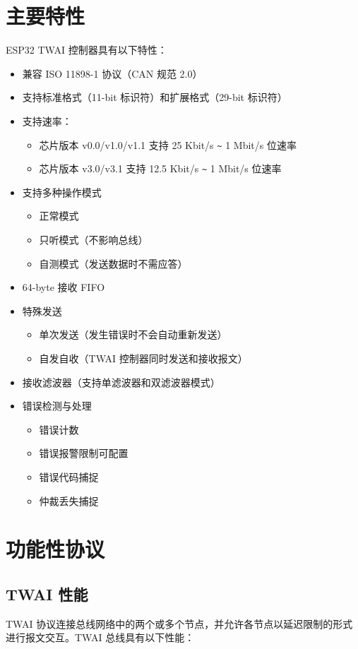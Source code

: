 \documentclass[main\_\_CN.tex]{subfiles}
\begin{document}
\section{主要特性}
ESP32 TWAI 控制器具有以下特性：
\begin{itemize}
    \item 兼容 ISO 11898-1 协议（CAN 规范 2.0）
    \item 支持标准格式（11-bit 标识符）和扩展格式（29-bit 标识符）
    \item 支持速率：
    \begin{itemize}
        \item 芯片版本 v0.0/v1.0/v1.1 支持 25 Kbit/s \verb+~+ 1 Mbit/s 位速率
        \item 芯片版本 v3.0/v3.1 支持 12.5 Kbit/s \verb+~+ 1 Mbit/s 位速率
    \end{itemize}
    \item 支持多种操作模式
    \begin{itemize}
        \item 正常模式
        \item 只听模式（不影响总线）
        \item 自测模式（发送数据时不需应答）
    \end{itemize}
    \item 64-byte 接收 FIFO
    \item 特殊发送
    \begin{itemize}
        \item 单次发送（发生错误时不会自动重新发送）
        \item 自发自收（TWAI 控制器同时发送和接收报文）
    \end{itemize}
    \item 接收滤波器（支持单滤波器和双滤波器模式）
    \item 错误检测与处理
    \begin{itemize}
        \item 错误计数
        \item 错误报警限制可配置
        \item 错误代码捕捉
        \item 仲裁丢失捕捉
    \end{itemize}
\end{itemize}

\section{功能性协议}
\label{subsec:protocol-description}
\subsection{TWAI 性能}
TWAI 协议连接总线网络中的两个或多个节点，并允许各节点以延迟限制的形式进行报文交互。TWAI 总线具有以下性能：
\end{document}
